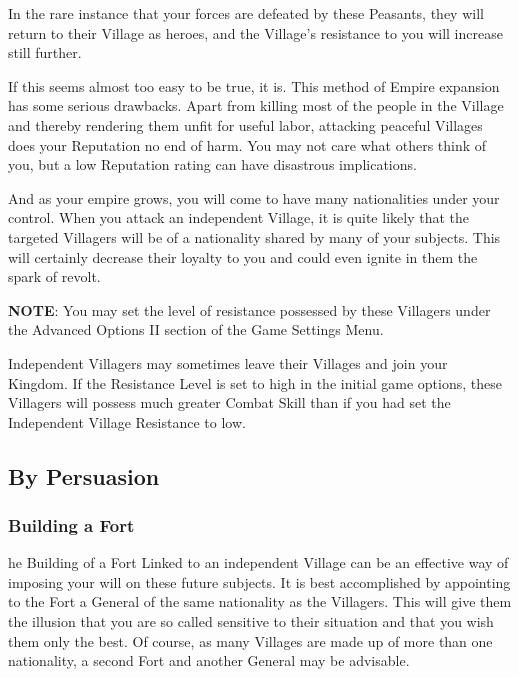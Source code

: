 In the rare instance that your forces are defeated by these Peasants, they will return to their Village as heroes, and the Village’s resistance to you will increase still further.

If this seems almost too easy to be true, it is. This method of Empire expansion has some serious drawbacks. Apart from killing most of the people in the Village and thereby rendering them unfit for useful labor, attacking peaceful Villages does your Reputation no end of harm. You may not care what others think of you, but a low Reputation rating can have disastrous implications.

And as your empire grows, you will come to have many nationalities under your control. When you attack an independent Village, it is quite likely that the targeted Villagers will be of a nationality shared by many of your subjects. This will certainly decrease their loyalty to you and could even ignite in them the spark of revolt.

\textbf{NOTE}: You may set the level of resistance possessed by these Villagers under the Advanced Options II section of the Game Settings Menu.

Independent Villagers may sometimes leave their Villages and join your Kingdom. If the Resistance Level is set to high in the initial game options, these Villagers will possess much greater Combat Skill than if you had set the Independent Village Resistance to low.

\subsection{\textsf{By Persuasion}}


\subsubsection{\textsf{Building a Fort}}

he Building of a Fort Linked to an independent Village can be an effective way of imposing your will on these future subjects. It is best accomplished by appointing to the Fort a General of the same nationality as the Villagers. This will give them the illusion that you are so called sensitive to their situation and that you wish them only the best. Of course, as many Villages are made up of more than one nationality, a second Fort and another General may be advisable.

